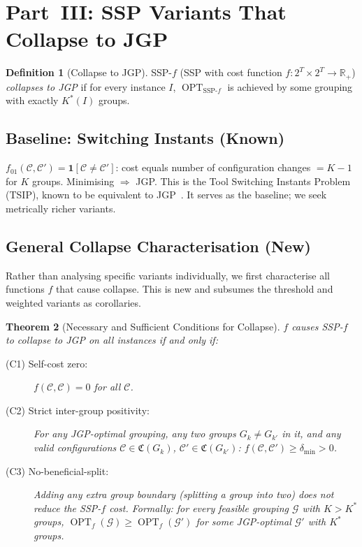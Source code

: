 \documentclass[11pt,a4paper]{article}
\theoremstyle{plain}
\newtheorem{theorem}{Theorem}[section]
\theoremstyle{definition}
\newtheorem{definition}[theorem]{Definition}
\DeclareMathOperator{\OPT}{OPT}
\newcommand{\Cconf}{\mathfrak{C}}
\newcommand{\calG}{\mathcal{G}}
\newcommand{\Kstar}{K^{*}}
\begin{document}
\section{Part~III: SSP Variants That Collapse to JGP}
\label{sec:partIII}

\begin{definition}[Collapse to JGP]
\label{def:collapse}
SSP-$f$ (SSP with cost function $f:2^T\times 2^T\to\mathbb{R}_+$)
\emph{collapses to JGP} if for every instance $I$,
$\OPT_{\mathrm{SSP}\text{-}f}$ is achieved by some grouping with exactly $\Kstar(I)$ groups.
\end{definition}

\subsection{Baseline: Switching Instants (Known)}

$f_{01}(\mathcal{C},\mathcal{C}')=\mathbf{1}[\mathcal{C}\ne\mathcal{C}']$: cost equals
number of configuration changes $=K-1$ for $K$ groups. Minimising $\Rightarrow$ JGP.
This is the Tool Switching Instants Problem (TSIP), known to be equivalent to
JGP~\cite{TangDenardo1988}. It serves as the baseline; we seek metrically richer variants.

\subsection{General Collapse Characterisation (New)}
\label{sec:general}

Rather than analysing specific variants individually, we first characterise all
functions $f$ that cause collapse. This is new and subsumes the threshold and
weighted variants as corollaries.

\begin{thmbox}
\begin{theorem}[Necessary and Sufficient Conditions for Collapse]
\label{thm:collapse}
$f$ causes SSP-$f$ to collapse to JGP on all instances if and only if:
\begin{description}
  \item[(C1) Self-cost zero:] $f(\mathcal{C},\mathcal{C})=0$ for all $\mathcal{C}$.
  \item[(C2) Strict inter-group positivity:] For any JGP-optimal grouping, any two
        groups $G_k\ne G_{k'}$ in it, and any valid configurations
        $\mathcal{C}\in\Cconf(G_k)$, $\mathcal{C}'\in\Cconf(G_{k'})$:
        $f(\mathcal{C},\mathcal{C}')\ge\delta_{\min}>0$.
  \item[(C3) No-beneficial-split:] Adding any extra group boundary (splitting a group
        into two) does not reduce the SSP-$f$ cost. Formally:
        for every feasible grouping $\calG$ with $K>\Kstar$ groups,
        $\OPT_f(\calG)\ge\OPT_f(\calG')$ for some JGP-optimal $\calG'$ with
        $\Kstar$ groups.
\end{description}
\end{theorem}
\end{thmbox}
\end{document}
